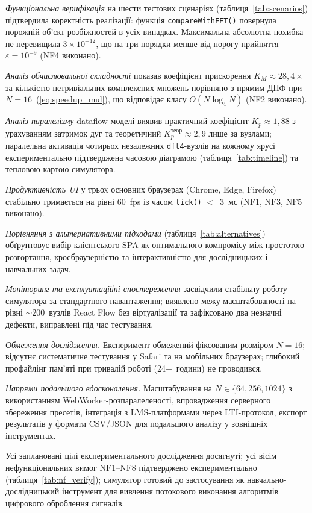 \emph{Функціональна верифікація} на шести тестових сценаріях
(таблиця~\ref{tab:scenarios}) підтвердила коректність реалізації:
функція \texttt{compareWithFFT()} повернула порожній об'єкт розбіжностей
в усіх випадках. Максимальна абсолютна похибка не перевищила
$3 \times 10^{-12}$, що на три порядки менше від порогу прийняття
$\varepsilon = 10^{-9}$ (NF4 виконано).

\emph{Аналіз обчислювальної складності} показав коефіцієнт прискорення
$K_M \approx 28{,}4\times$ за кількістю нетривіальних комплексних
множень порівняно з прямим ДПФ при $N = 16$~(\ref{eq:speedup_mul}),
що відповідає класу $O(N \log_4 N)$ (NF2 виконано).

\emph{Аналіз паралелізму} dataflow-моделі виявив практичний коефіцієнт
$K_p \approx 1{,}88$ з урахуванням затримок дуг та теоретичний
$K_p^{\text{теор}} \approx 2{,}9$ лише за вузлами; паралельна активація
чотирьох незалежних \texttt{dft4}-вузлів на кожному ярусі експериментально
підтверджена часовою діаграмою (таблиця~\ref{tab:timeline}) та
тепловою картою симулятора.

\emph{Продуктивність UI} у трьох основних браузерах (Chrome, Edge,
Firefox) стабільно тримається на рівні 60~fps із часом \texttt{tick()}
$<$~3~мс (NF1, NF3, NF5 виконано).

\emph{Порівняння з альтернативними підходами} (таблиця~\ref{tab:alternatives})
обґрунтовує вибір клієнтського SPA як оптимального компромісу між
простотою розгортання, кросбраузерністю та інтерактивністю для
дослідницьких і навчальних задач.

\emph{Моніторинг та експлуатаційні спостереження} засвідчили стабільну
роботу симулятора за стандартного навантаження; виявлено межу
масштабованості на рівні $\sim 200$~вузлів React Flow без віртуалізації
та зафіксовано два незначні дефекти, виправлені під час тестування.

\emph{Обмеження дослідження.} Експеримент обмежений фіксованим
розміром $N=16$; відсутнє систематичне тестування у Safari та на
мобільних браузерах; глибокий профайлінг пам'яті при тривалій роботі
(24+~години) не проводився.

\emph{Напрями подальшого вдосконалення.} Масштабування на $N \in \{64, 256, 1024\}$
з використанням WebWorker-розпаралеленості, впровадження серверного
збереження пресетів, інтеграція з LMS-платформами через LTI-протокол,
експорт результатів у формати CSV/JSON для подальшого аналізу у
зовнішніх інструментах.

Усі заплановані цілі експериментального дослідження досягнуті; усі
вісім нефункціональних вимог NF1--NF8 підтверджено експериментально
(таблиця~\ref{tab:nf_verify}); симулятор готовий до застосування як
навчально-дослідницький інструмент для вивчення потокового виконання
алгоритмів цифрового оброблення сигналів.